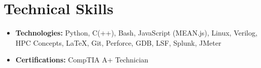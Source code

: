 \documentclass[11pt,letterpaper,sans]{moderncv}
\begin{document}
\begin{itemize}

\end{itemize}




\section{Technical Skills}

\vspace{2pt}

\begin{itemize}
\item[]  \textbf{Technologies:} Python, 
C(++), Bash, JavaScript (MEAN.js), Linux, Verilog, HPC Concepts, LaTeX, Git, Perforce, GDB, LSF, Splunk, JMeter 
\vspace{4pt}



\item[]  \textbf{Certifications:} CompTIA A+ Technician

\end{itemize}
\end{document}

